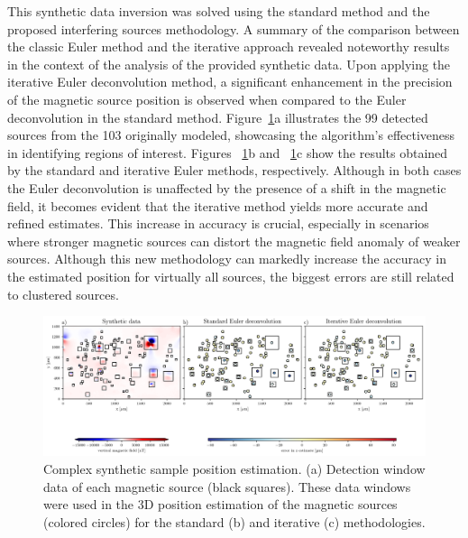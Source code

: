 This synthetic data inversion was solved using the standard method \citep{Souza-Junior2023b} and the proposed interfering sources methodology. A summary of the comparison between the classic Euler method and the iterative approach revealed noteworthy results in the context of the analysis of the provided synthetic data. Upon applying the iterative Euler deconvolution method, a significant enhancement in the precision of the magnetic source position is observed when compared to the Euler deconvolution in the standard method. Figure~\ref{euler2}a illustrates the 99 detected sources from the 103 originally modeled, showcasing the algorithm's effectiveness in identifying regions of interest. Figures ~\ref{euler2}b and ~\ref{euler2}c show the results obtained by the standard and iterative Euler methods, respectively. Although in both cases the Euler deconvolution is unaffected by the presence of a shift in the magnetic field, it becomes evident that the iterative method yields more accurate and refined estimates. This increase in accuracy is crucial, especially in scenarios where stronger magnetic sources can distort the magnetic field anomaly of weaker sources. Although this new methodology can markedly increase the accuracy in the estimated position for virtually all sources, the biggest errors are still related to clustered sources.


\begin{figure}[tb!]
  \centering
  \includegraphics[width=1\linewidth]{paper/figures/euler-comparion-2.png}
  \caption{Complex synthetic sample position estimation. (a) Detection window data of each magnetic source (black squares). These data windows were used in the 3D position estimation of the magnetic sources (colored circles) for the standard (b) and iterative (c) methodologies. }
  \label{euler2}
\end{figure}

